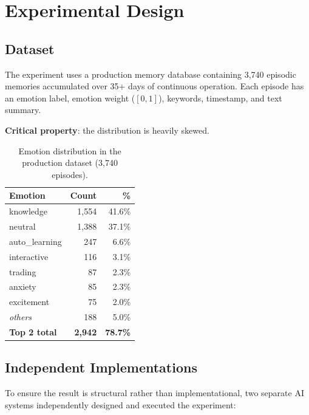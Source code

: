 \documentclass[11pt,a4paper]{article}
\begin{document}
\section{Experimental Design}

\subsection{Dataset}

The experiment uses a production memory database containing 3,740 episodic memories accumulated over 35+ days of continuous operation. Each episode has an emotion label, emotion weight ($[0, 1]$), keywords, timestamp, and text summary.

\textbf{Critical property}: the distribution is heavily skewed.

\begin{table}[h]
\centering
\caption{Emotion distribution in the production dataset (3,740 episodes).}
\label{tab:distribution}
\small
\begin{tabular}{@{}lrr@{}}
\toprule
\textbf{Emotion} & \textbf{Count} & \textbf{\%} \\
\midrule
knowledge       & 1,554 & 41.6\% \\
neutral         & 1,388 & 37.1\% \\
auto\_learning  & 247   & 6.6\% \\
interactive     & 116   & 3.1\% \\
trading         & 87    & 2.3\% \\
anxiety         & 85    & 2.3\% \\
excitement      & 75    & 2.0\% \\
\emph{others}   & 188   & 5.0\% \\
\midrule
\textbf{Top 2 total} & \textbf{2,942} & \textbf{78.7\%} \\
\bottomrule
\end{tabular}
\end{table}

\subsection{Independent Implementations}

To ensure the result is structural rather than implementational, two separate AI systems independently designed and executed the experiment:
\end{document}
